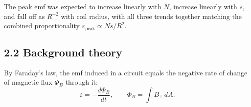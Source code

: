 \documentclass[11pt]{article}
\begin{document}
The peak emf was expected to increase linearly with $N$, increase linearly with $s$, and fall off as $R^{-2}$ with coil radius, with all three trends together matching the combined proportionality $\varepsilon_{\text{peak}} \propto Ns/R^2$.

\subsection*{2.2 Background theory}
By Faraday's law, the emf induced in a circuit equals the negative rate of change of magnetic flux $\Phi_B$ through it:
\begin{equation}
\varepsilon = -\frac{d\Phi_B}{dt}, \qquad \Phi_B = \int B_\perp \, dA .
\end{equation}
\end{document}
